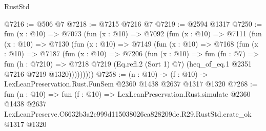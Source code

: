 \begin{lexlean}{RustStd}
\begin{coremodule}
@7216 := @506 @7
@7218 := @7215 @7216 @7
@7219 := @2594 @1317
@7250 := fun (x : @10) =>
  @7073
    (fun (x : @10) =>
    @7092
      (fun (x : @10) =>
      @7111
        (fun (x : @10) =>
        @7130
          (fun (x : @10) =>
          @7149
            (fun (x : @10) =>
            @7168
              (fun (x : @10) =>
              @7187
                (fun (x : @10) =>
                @7206
                  (fun (x : @10) =>
                  fun (fn : @7) =>
                  fun (h : @7210) =>
                  @7218
                    @7219
                    (Eq.refl.{2} (Sort 1) @7)
                    (heq_of_eq.{1} @2351 @7216 @7219 @1320)))))))))
@7258 := (n : @10) -> (f : @10) -> LexLeanPreservation.Rust.FunSem @2360 @1438 @2637 @1317 @1320
@7268 := fun (n : @10) =>
  fun (f : @10) =>
  LexLeanPreservation.Rust.simulate
    @2360
    @1438
    @2637
    LexLeanPreserve.C6632b3a2e999d115038026ca828209de.R29.RustStd.crate_ok
    @1317
    @1320
\end{coremodule}
\end{lexlean}
